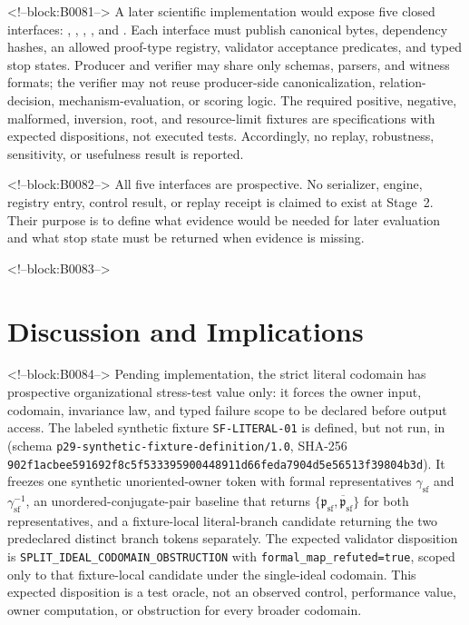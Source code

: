 \documentclass[11pt,a4paper]{article}
\begin{document}
<!--block:B0081-->
A later scientific implementation would expose five closed interfaces: , , , , and . Each interface must publish canonical bytes, dependency hashes, an allowed proof-type registry, validator acceptance predicates, and typed stop states. Producer and verifier may share only schemas, parsers, and witness formats; the verifier may not reuse producer-side canonicalization, relation-decision, mechanism-evaluation, or scoring logic. The required positive, negative, malformed, inversion, root, and resource-limit fixtures are specifications with expected dispositions, not executed tests. Accordingly, no replay, robustness, sensitivity, or usefulness result is reported.

<!--block:B0082-->
All five interfaces are prospective. No serializer, engine, registry entry, control result, or replay receipt is claimed to exist at Stage~2. Their purpose is to define what evidence would be needed for later evaluation and what stop state must be returned when evidence is missing.

<!--block:B0083-->
\section{Discussion and Implications}

<!--block:B0084-->
Pending implementation, the strict literal codomain has prospective organizational stress-test value only: it forces the owner input, codomain, invariance law, and typed failure scope to be declared before output access. The labeled synthetic fixture \texttt{SF-LITERAL-01} is defined, but not run, in  (schema \texttt{p29-synthetic-fixture-definition/1.0}, SHA-256 \texttt{902f1acbee591692f8c5f533395900448911d66feda7904d5e56513f39804b3d}). It freezes one synthetic unoriented-owner token with formal representatives \(\gamma_{\mathrm{sf}}\) and \(\gamma_{\mathrm{sf}}^{-1}\), an unordered-conjugate-pair baseline that returns \(\{\mathfrak p_{\mathrm{sf}},\overline{\mathfrak p}_{\mathrm{sf}}\}\) for both representatives, and a fixture-local literal-branch candidate returning the two predeclared distinct branch tokens separately. The expected validator disposition is \texttt{SPLIT\_IDEAL\_CODOMAIN\_OBSTRUCTION} with \texttt{formal\_map\_refuted=true}, scoped only to that fixture-local candidate under the single-ideal codomain. This expected disposition is a test oracle, not an observed control, performance value, owner computation, or obstruction for every broader codomain.
\end{document}
